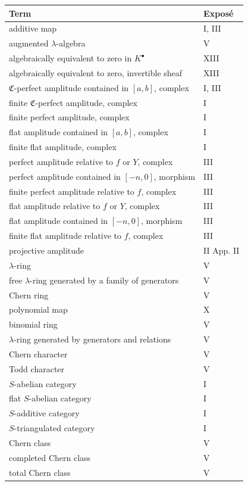 \documentclass[11pt]{article}
\theoremstyle{plain}
\theoremstyle{definition}
\theoremstyle{remark}
\begin{document}
\begin{longtable}{p{8.5cm}l}
\toprule
\textbf{Term} & \textbf{Exposé}\\
\midrule
\endhead
additive map & I, III\\
augmented $\lambda$-algebra & V\\
algebraically equivalent to zero in $K^\bullet$ & XIII\\
algebraically equivalent to zero, invertible sheaf & XIII\\
$\mathfrak C$-perfect amplitude contained in $[a,b]$, complex & I, III\\
finite $\mathfrak C$-perfect amplitude, complex & I\\
finite perfect amplitude, complex & I\\
flat amplitude contained in $[a,b]$, complex & I\\
finite flat amplitude, complex & I\\
perfect amplitude relative to $f$ or $Y$, complex & III\\
perfect amplitude contained in $[-n,0]$, morphism & III\\
finite perfect amplitude relative to $f$, complex & III\\
flat amplitude relative to $f$ or $Y$, complex & III\\
flat amplitude contained in $[-n,0]$, morphism & III\\
finite flat amplitude relative to $f$, complex & III\\
projective amplitude & II App. II\\
$\lambda$-ring & V\\
free $\lambda$-ring generated by a family of generators & V\\
Chern ring & V\\
polynomial map & X\\
binomial ring & V\\
$\lambda$-ring generated by generators and relations & V\\
Chern character & V\\
Todd character & V\\
$S$-abelian category & I\\
flat $S$-abelian category & I\\
$S$-additive category & I\\
$S$-triangulated category & I\\
Chern class & V\\
completed Chern class & V\\
total Chern class & V\\

\end{longtable}
\end{document}
